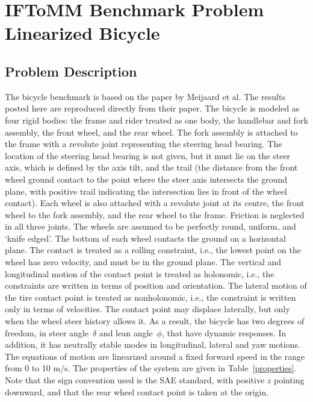 \chapter*{IFToMM Benchmark Problem Linearized Bicycle}
\section*{Problem Description}
\setcounter{chapter}{1}
The bicycle benchmark is based on the paper by Meijaard et al\cite{meijaard}.  The results posted here are reproduced directly from their paper.  The bicycle is modeled as four rigid bodies: the frame and rider treated as one body, the handlebar and fork assembly, the front wheel, and the rear wheel.  The fork assembly is attached to the frame with a revolute joint representing the steering head bearing.  The location of the steering head bearing is not given, but it must lie on the steer axis, which is defined by the axis tilt, and the trail (the distance from the front wheel ground contact to the point where the steer axis intersects the ground plane, with positive trail indicating the intersection lies in front of the wheel contact).  Each wheel is also attached with a revolute joint at its centre, the front wheel to the fork assembly, and the rear wheel to the frame.  Friction is neglected in all three joints.  The wheels are assumed to be perfectly round, uniform, and `knife edged'.  The bottom of each wheel contacts the ground on a horizontal plane.  The contact is treated as a rolling constraint, i.e., the lowest point on the wheel has zero velocity, and must be in the ground plane.  The vertical and longitudinal motion of the contact point is treated as holonomic, i.e., the constraints are written in terms of position and orientation.  The lateral motion of the tire contact point is treated as nonholonomic, i.e., the constraint is written only in terms of velocities.  The contact point may displace laterally, but only when the wheel steer history allows it.  As a result, the bicycle has two degrees of freedom, in steer angle~$\delta$ and lean angle~$\phi$, that have dynamic responses.  In addition, it has neutrally stable modes in longitudinal, lateral and yaw motions.  The equations of motion are linearized around a fixed forward speed in the range from 0 to 10 \si{\m/\s}.  The properties of the system are given in Table~\ref{properties}.  Note that the sign convention used is the SAE standard, with positive $z$ pointing downward, and that the rear wheel contact point is taken at the origin.

